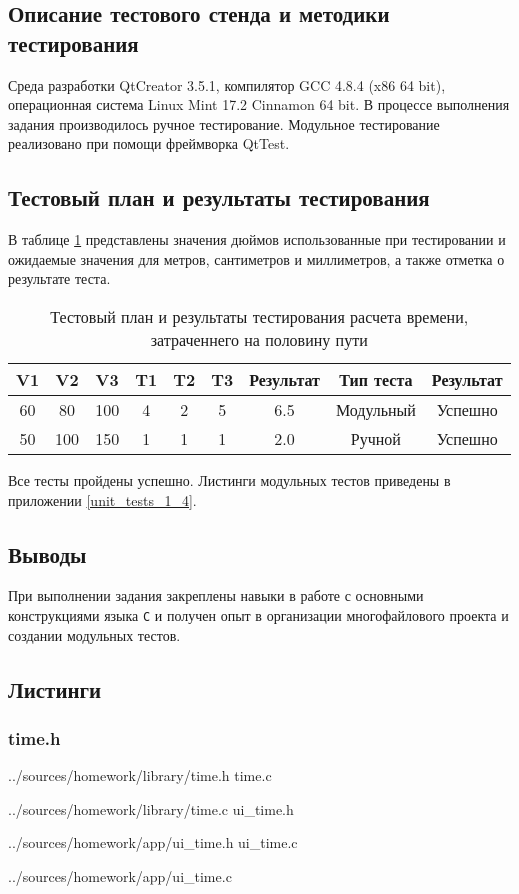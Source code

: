 \documentclass[12pt,a4paper]{report}
\begin{document}
\subsection{Описание тестового стенда и методики тестирования}
\hspace{\parindent}Среда разработки QtCreator 3.5.1, компилятор GCC 4.8.4 (x86 64 bit), операционная система Linux Mint 17.2 Cinnamon 64 bit.
В процессе выполнения задания производилось ручное тестирование.
Модульное тестирование реализовано при помощи фреймворка QtTest.

\subsection{Тестовый план и результаты тестирования}
\hspace{\parindent}В таблице \ref{time_test_plan} представлены значения дюймов использованные при тестировании и ожидаемые значения для метров, сантиметров и миллиметров, а также отметка о результате теста.
\FloatBarrier
\begin{table}[h]
\caption{Тестовый план и результаты тестирования расчета времени, затраченнего на половину пути}
\label{time_test_plan}
\begin{tabular}{| c c c | c c c | c | c | c |}
\hline 
V1 & V2 & V3 & T1 & T2 & T3 & Результат & Тип теста & Результат \\ 
\hline 
60 & 80 & 100 & 4 & 2 & 5 & 6.5 & Модульный & Успешно \\ 
\hline 
50 & 100 & 150 & 1 & 1 & 1 & 2.0 & Ручной & Успешно \\ 
\hline 
\end{tabular} 
\end{table}
\FloatBarrier
Все тесты пройдены успешно. Листинги модульных тестов приведены в приложении \ref{unit_tests_1_4}.
\subsection{Выводы}
\hspace{\parindent}При выполнении задания закреплены навыки в работе с основными конструкциями языка \verb+C+ и получен опыт в организации многофайлового проекта и создании модульных тестов.

\newpage
\subsection{Листинги}
\subsubsection*{time.h}

{../sources/homework/library/time.h}
time.c

{../sources/homework/library/time.c}
ui\_time.h

{../sources/homework/app/ui_time.h}
ui\_time.c

{../sources/homework/app/ui_time.c}
\end{document}
